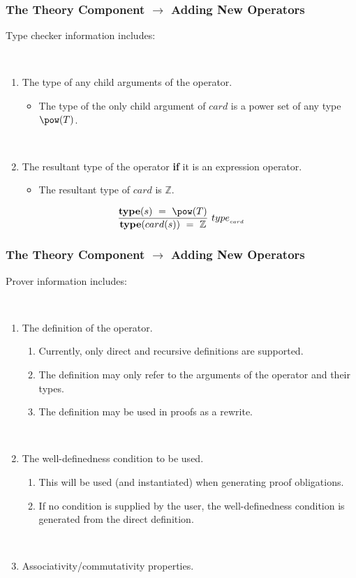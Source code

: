 \documentclass{beamer}
\begin{document}
	\begin{frame}
		\frametitle{The Theory Component $\rightarrow$ Adding New Operators}
		Type checker information includes:

~

		\begin{enumerate}
			\item The type of any child arguments of the operator.
				\begin{itemize}
					\item The type of the only child argument of $card$ is a power set of any type $\pow(T)$.

~

				\end{itemize}
			\item The resultant type of the operator \textbf{if} it is an expression operator.
				\begin{itemize}
					\item The resultant type of $card$ is $\mathbb{Z}$.
				\end{itemize}
		\end{enumerate}
		\vspace{5pt}
		\begin{equation*}
			\frac{\textbf{type}(s)~=~\pow(T)}{\textbf{type}(card(s))~=~\mathbb{Z}}~type_{_{card}}
		\end{equation*}
	\end{frame}
	\begin{frame}
		\frametitle{The Theory Component $\rightarrow$ Adding New Operators}
		Prover information includes:

~

		\begin{enumerate}
			\item The definition of the operator.
				\begin{enumerate}
					\item Currently, only direct and recursive definitions are supported.
					\item The definition may only refer to the arguments of the operator and their types.
					\item The definition may be used in proofs as a rewrite.
				\end{enumerate}
~

			\item The well-definedness condition to be used.
				\begin{enumerate}
					\item This will be used (and instantiated) when generating proof obligations.
					\item If no condition is supplied by the user, the well-definedness condition is generated from the direct definition.
				\end{enumerate}

~

			\item Associativity/commutativity properties.
		\end{enumerate}
	\end{frame}
\end{document}
